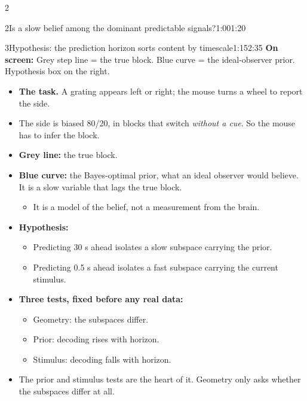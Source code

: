 \documentclass[10pt]{article}
\newcommand{\point}[1]{{\color{ink}\textbf{On screen:} #1}\par}
\begin{document}
\begin{multicols}{2}
\begin{slidebox}{2}{Is a slow belief among the dominant predictable signals?}{1:00}{1:20}
\end{slidebox}
\begin{slidebox}{3}{Hypothesis: the prediction horizon sorts content by timescale}{1:15}{2:35}
\point{Grey step line = the true block. Blue curve = the ideal-observer prior. Hypothesis box on the right.}
\begin{itemize}
\item \textbf{The task.} A grating appears left or right; the mouse turns a wheel to report the side.
\item The side is biased 80/20, in blocks that switch \emph{without a cue}. So the mouse has to infer the block.
\item \textbf{Grey line:} the true block.
\item \textbf{Blue curve:} the Bayes-optimal prior, what an ideal observer would believe. It is a slow variable
that lags the true block.
  \begin{itemize}
  \item It is a model of the belief, not a measurement from the brain.
  \end{itemize}
\item \textbf{Hypothesis:}
  \begin{itemize}
  \item Predicting 30 s ahead isolates a slow subspace carrying the prior.
  \item Predicting 0.5 s ahead isolates a fast subspace carrying the current stimulus.
  \end{itemize}
\item \textbf{Three tests, fixed before any real data:}
  \begin{itemize}
  \item Geometry: the subspaces differ.
  \item Prior: decoding rises with horizon.
  \item Stimulus: decoding falls with horizon.
  \end{itemize}
\item The prior and stimulus tests are the heart of it. Geometry only asks whether the subspaces differ at all.
\end{itemize}


\end{slidebox}
\end{multicols}
\end{document}
